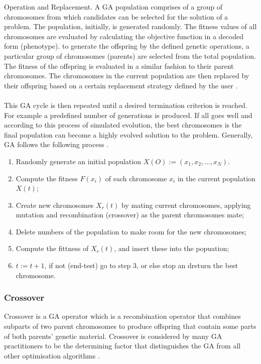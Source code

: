 \documentclass[a4paper, 11pt]{article}
\begin{document}
    Operation and Replacement. A GA population comprises of a group of chromosomes from which candidates can be selected for the
    solution of a problem. The population, initially, is generated randomly. The fitness values of all chromosomes are 
    evaluated by calculating the objective function in a decoded form (phenotype). to generate the offspring by the defined 
    genetic operations, a particular group of chromosomes (parents) are selected from the total population. The fitness of the 
    offspring is evaluated in a similar fashion to their parent chromosomes. The chromosomes in the current population are then 
    replaced by their offspring based on a certain replacement strategy defined by the user \cite{Tang1996}.
    \\\\
    This GA cycle is then repeated until a desired termination criterion is reached. For example a predefined number of generations
    is produced. If all goes well and according to this process of simulated evolution, the best chromosomes is the final population 
    can become a highly evolved solution to the problem. Generally, GA follows the following process \cite{Tang1996}.

    \begin{enumerate}
       \item Randomly generate an initial population $X(O):= (x_{1}, x_{2}, ..., x_{N})$.
       \item Compute the fitness $F(x_{i})$ of each chromosome $x_{i}$ in the  current population $X(t)$;
       \item Create new chromosomes $X_{r}(t)$ by mating current chromosomes, applying mutation and recombination (crossover) as the 
       parent chromosomes mate;
       \item Delete numbers of the population  to make room for the new chromosomes;
       \item Compute the fittness of $X_{r}(t)$, and insert these into the popuation;
       \item $t:= t + 1$, if not (end-test) go to step 3, or else stop an dreturn the best chromosome.
   \end{enumerate}

        \subsubsection{Crossover}
            Crossover is a GA operator which is a recombination operator that combines subparts of two parent 
            chromosomes to produce offspring that contain some parts of both parents' genetic material. Crossover
            is considered by many GA practitioners to be the determining factor that distinguishes the GA from
            all other optimisation algorithms \cite{Tang1996}.
\end{document}
